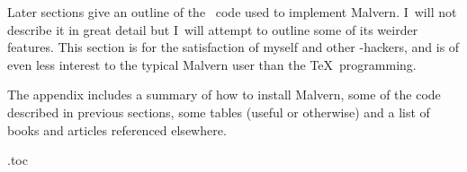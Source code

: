 	Later sections give an outline of the \MF\ code used to
	implement Malvern.  I~will not describe it in great detail but
	I~will attempt to outline some of its weirder features.  This
	section is for the satisfaction of myself and other \MF-hackers,
	and is of even less interest to the typical Malvern user than
	the \TeX\ programming.
\fi

	The appendix includes a summary of how to install Malvern, some
	of the code described in previous sections, some tables (useful
	or otherwise) and a list of books and articles referenced
	elsewhere.



\immediate\closeout\TOCfile
\begingroup

\def\TOCentrysubsec#1#2#3{#1\ #2\quad}

 \jobname.toc
\endgroup
\bye



